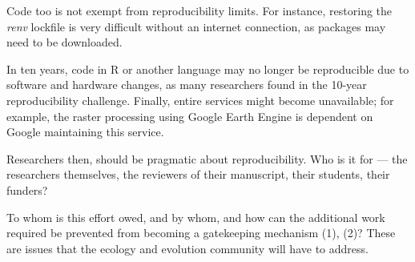 	Code too is not exempt from reproducibility limits. For instance, restoring the \textit{renv} lockfile is very difficult without an internet connection, as packages may need to be downloaded.

	In ten years, code in R or another language may no longer be reproducible due to software and hardware changes, as many researchers found in the 10-year reproducibility challenge. Finally, entire services might become unavailable; for example, the raster processing using Google Earth Engine is dependent on Google maintaining this service.

	Researchers then, should be pragmatic about reproducibility. Who is it for — the researchers themselves, the reviewers of their manuscript, their students, their funders?

	To whom is this effort owed, and by whom, and how can the additional work required be prevented from becoming a gatekeeping mechanism {\color{red}(1), (2)}? These are issues that the ecology and evolution community will have to address.
	
\afterpage{\nopagecolor}
\pagestyle{scrheadings}
